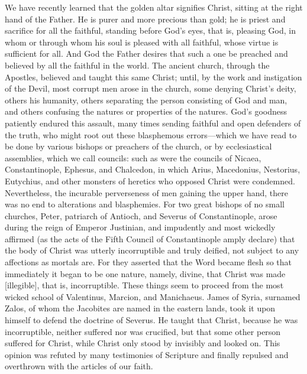 We have recently learned that the golden altar signifies Christ, sitting at the right hand of the Father. He is purer and more precious than gold; he is priest and sacrifice for all the faithful, standing before God’s eyes, that is, pleasing God, in whom or through whom his soul is pleased with all faithful, whose virtue is sufficient for all. And God the Father desires that such a one be preached and believed by all the faithful in the world. The ancient church, through the Apostles, believed and taught this same Christ; until, by the work and instigation of the Devil, most corrupt men arose in the church, some denying Christ’s deity, others his humanity, others separating the person consisting of God and man, and others confusing the natures or properties of the natures. God’s goodness patiently endured this assault, many times sending faithful and open defenders of the truth, who might root out these blasphemous errors—which we have read to be done by various bishops or preachers of the church, or by ecclesiastical assemblies, which we call councils: such as were the councils of Nicaea, Constantinople, Ephesus, and Chalcedon, in which Arius, Macedonius, Nestorius, Eutychius, and other monsters of heretics who opposed Christ were condemned. Nevertheless, the incurable perverseness of men gaining the upper hand, there was no end to alterations and blasphemies. For two great bishops of no small churches, Peter, patriarch of Antioch, and Severus of Constantinople, arose during the reign of Emperor Justinian, and impudently and most wickedly affirmed (as the acts of the Fifth Council of Constantinople amply declare) that the body of Christ was utterly incorruptible and truly deified, not subject to any affections as mortals are. For they asserted that the Word became flesh so that immediately it began to be one nature, namely, divine, that Christ was made [illegible], that is, incorruptible. These things seem to proceed from the most wicked school of Valentinus, Marcion, and Manichaeus. James of Syria, surnamed Zalos, of whom the Jacobites are named in the eastern lands, took it upon himself to defend the doctrine of Severus. He taught that Christ, because he was incorruptible, neither suffered nor was crucified, but that some other person suffered for Christ, while Christ only stood by invisibly and looked on. This opinion was refuted by many testimonies of Scripture and finally repulsed and overthrown with the articles of our faith.

